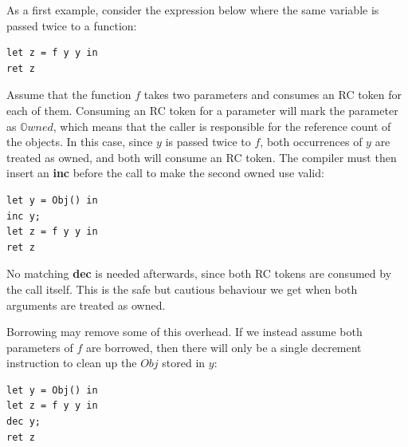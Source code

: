 






As a first example, consider the expression below where the same variable is passed twice to a function:

\begin{verbatim}
let z = f y y in
ret z
\end{verbatim}

Assume that the function $f$ takes two parameters and consumes an RC token for each of them. Consuming an RC token for a parameter will mark the parameter as $\mathbb{O}wned$, which means that the caller is responsible for the reference count of the objects. In this case, since $y$ is passed twice to $f$, both occurrences of $y$ are treated as owned, and both will consume an RC token. The compiler must then insert an \textbf{inc} before the call to make the second owned use valid:

\begin{verbatim}
let y = Obj() in
inc y;
let z = f y y in
ret z
\end{verbatim}

No matching \textbf{dec} is needed afterwards, since both RC tokens are consumed by the call itself. This is the safe but cautious behaviour we get when both arguments are treated as owned.

Borrowing may remove some of this overhead. If we instead assume both parameters of $f$ are borrowed, then there will only be a single decrement instruction to clean up the $Obj$ stored in $y$:

\begin{verbatim}
let y = Obj() in
let z = f y y in
dec y;
ret z
\end{verbatim}

